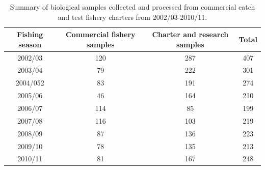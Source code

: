 \begin{table}
	\caption{Summary of biological samples collected and processed from commercial catch and test fishery charters from 2002/03-2010/11.}
	\label{table:PartII:sampleSizes}
	\begin{center}
\begin{tabular}{cccc}
\hline
Fishing season & Commercial fishery samples & Charter and research samples & Total\\
\hline
2002/03 & 120 & 287 & 407\\
2003/04 & 79 & 222 & 301\\
2004/052 & 83 & 191 & 274\\
2005/06 & 46 & 164 & 210\\
2006/07 & 114 & 85 & 199\\
2007/08 & 116 & 103 & 219\\
2008/09 & 87 & 136 & 223\\
2009/10 & 78 & 135 & 213\\
2010/11 & 81 & 167 & 248\\
\hline
\end{tabular}
	
	\end{center}
\end{table}
	
	
	
	
	

